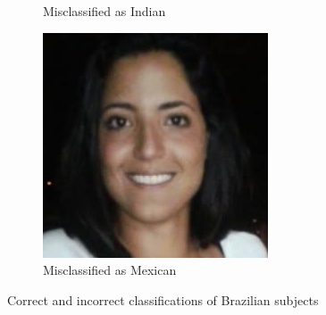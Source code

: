 \begin{figure}[!htb]
\begin{subfigure}[t]{0.3\textwidth}
      \caption{Misclassified as Indian}
    \end{subfigure}
    \begin{subfigure}[t]{0.3\textwidth}
        \includegraphics[width=\textwidth]{figures/results/misclassification/brazil-mexico.jpg}
      \caption{Misclassified as Mexican}
    \end{subfigure}
\caption{Correct and incorrect classifications of Brazilian subjects}
\label{fig:results:dc:misclass:brazil}
\end{figure}

